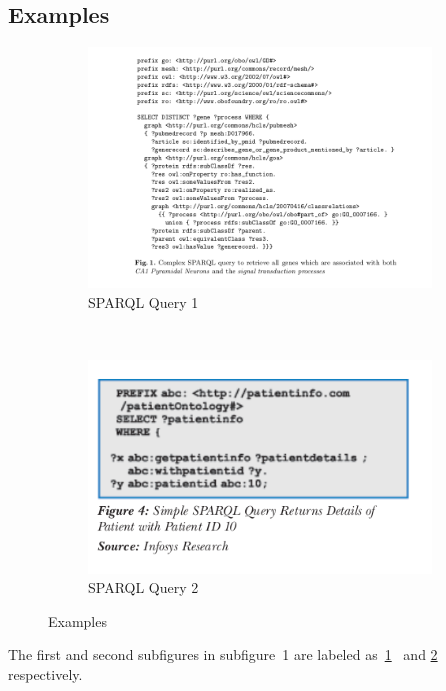   \subsection{Examples}
  \begin{figure}[h!]
    \begin{subfigure}[b]{.5\linewidth}
      \includegraphics[width=1.2\textwidth]{sparql1.png}
      \caption{SPARQL Query 1}
      \label{fig:first}
    \end{subfigure}
    ~
    \begin{subfigure}[b]{.5\linewidth}
      \includegraphics[width=1.2\textwidth]{sparqlh.png}
      \caption{SPARQL Query 2}
      \label{fig:second}
    \end{subfigure}
    \caption{Examples}
    \label{fig:sparql_examples}
  \end{figure}

  \noindent The first and second subfigures in subfigure\
  1 are labeled as\
  \ref{fig:first} \cite{stenzhorn2008simplifying}\
  and \ref{fig:second}  \cite{parachuri2008role} respectively.\\
